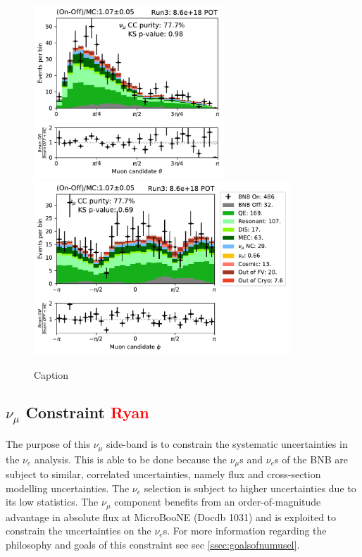 \begin{figure}
    \centering
    \includegraphics[height=6.5cm]{NuMuCCsel/Images/run3/numu_theta_run3.pdf} \hspace{2mm}
    \includegraphics[height=6.5cm]{NuMuCCsel/Images/run3/numu_phi_run3.pdf}
    \caption{Caption}
    \label{fig:numu_angles}
\end{figure}

\subsection{$\nu_{\mu}$ Constraint \textcolor{red}{Ryan}}
\label{ssec:NuMUCCsel:constr}
\par The purpose of this $\nu_{\mu}$ side-band is to constrain the systematic uncertainties in the $\nu_{e}$ analysis. This is able to be done because the $\nu_{\mu}$s and $\nu_{e}$s of the BNB are subject to similar, correlated uncertainties, namely flux and cross-section modelling uncertainties. The $\nu_{e}$ selection is subject to higher uncertainties due to its low statistics. The $\nu_{\mu}$ component benefits from an order-of-magnitude advantage in absolute flux at MicroBooNE (Docdb 1031) and is exploited to constrain the uncertainties on the $\nu_{e}$s. For more information regarding the philosophy and goals of this constraint see sec \ref{ssec:goalsofnumusel}.

